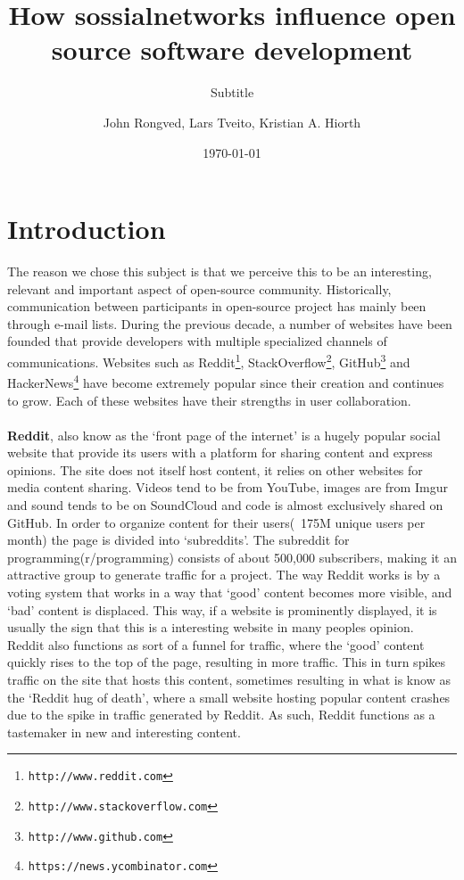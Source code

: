 \documentclass[a4paper,11pt,oneside]{book} %
\title{How sossialnetworks influence open source software development}
\subtitle{Subtitle}
\author{John Rongved, Lars Tveito, Kristian A. Hiorth}
\date{\today}
\begin{document}
\ififorside

\frontmatter

  \tableofcontents

  \mainmatter

\chapter*{Introduction}

The reason we chose this subject is that we perceive this to be an interesting, relevant and important aspect of open-source community. Historically, communication between participants in open-source project has mainly been through e-mail lists. During the previous decade, a number of websites have been founded that provide developers with multiple specialized channels of communications. Websites such as  Reddit\footnote{\texttt{http://www.reddit.com}}, StackOverflow\footnote{\texttt{http://www.stackoverflow.com}}, GitHub\footnote{\texttt{http://www.github.com}} and HackerNews\footnote{\texttt{https://news.ycombinator.com}} have become extremely popular since their creation and continues to grow. Each of these websites have their strengths in user collaboration. 
\\\\
\textbf{Reddit}, also know as the ‘front page of the internet’ is a hugely popular social website that provide its users with a platform for sharing content and express opinions. The site does not itself host content, it relies on other websites for media content sharing. Videos tend to be from YouTube, images are from Imgur and sound tends to be on SoundCloud and code is almost exclusively shared on GitHub. In order to organize content for their users(~175M unique users per month) the page is divided into ‘subreddits’. The subreddit for programming(r/programming) consists of about 500,000 subscribers, making it an attractive group to generate traffic for a project. The way Reddit works is by a voting system that works in a way that ‘good’ content becomes more visible, and ‘bad’ content is displaced. This way, if a website is prominently displayed, it is usually the sign that this is a interesting website in many peoples opinion.
\\
Reddit also functions as sort of a funnel for traffic, where the ‘good’ content quickly rises to the top of the page, resulting in more traffic. This in turn spikes traffic on the site that hosts this content, sometimes resulting in what is know as the ‘Reddit hug of death’, where a small website hosting popular content crashes due to the spike in traffic generated by Reddit. As such, Reddit functions as a tastemaker in new and interesting content. 
\end{document}
